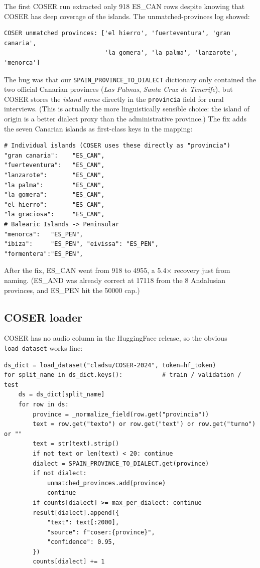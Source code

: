 \documentclass[11pt,a4paper]{article}
\begin{document}
The first COSER run extracted only 918 ES\_CAN rows despite knowing that
COSER has deep coverage of the islands. The unmatched-provinces log
showed:

\begin{lstlisting}[style=shellcode]
COSER unmatched provinces: ['el hierro', 'fuerteventura', 'gran canaria',
                            'la gomera', 'la palma', 'lanzarote', 'menorca']
\end{lstlisting}

The bug was that our \texttt{SPAIN\_PROVINCE\_TO\_DIALECT} dictionary
only contained the two official Canarian provinces
(\emph{Las Palmas}, \emph{Santa Cruz de Tenerife}), but COSER stores the
\emph{island name} directly in the \texttt{provincia} field for rural
interviews. (This is actually the more linguistically sensible choice:
the island of origin is a better dialect proxy than the administrative
province.) The fix adds the seven Canarian islands as first-class keys in
the mapping:

\begin{lstlisting}[style=pycode,caption={Canarian island additions to \texttt{SPAIN\_PROVINCE\_TO\_DIALECT}.}]
# Individual islands (COSER uses these directly as "provincia")
"gran canaria":    "ES_CAN",
"fuerteventura":   "ES_CAN",
"lanzarote":       "ES_CAN",
"la palma":        "ES_CAN",
"la gomera":       "ES_CAN",
"el hierro":       "ES_CAN",
"la graciosa":     "ES_CAN",
# Balearic Islands -> Peninsular
"menorca":   "ES_PEN",
"ibiza":     "ES_PEN", "eivissa": "ES_PEN",
"formentera":"ES_PEN",
\end{lstlisting}

After the fix, ES\_CAN went from 918 to \num{4955}, a 5.4$\times$
recovery just from naming. (ES\_AND was already correct at \num{17118}
from the 8 Andalusian provinces, and ES\_PEN hit the \num{50000} cap.)

\subsection{COSER loader}

COSER has no audio column in the HuggingFace release, so the obvious
\texttt{load\_dataset} works fine:

\begin{lstlisting}[style=pycode,caption={COSER load + iterate all three splits.}]
ds_dict = load_dataset("cladsu/COSER-2024", token=hf_token)
for split_name in ds_dict.keys():           # train / validation / test
    ds = ds_dict[split_name]
    for row in ds:
        province = _normalize_field(row.get("provincia"))
        text = row.get("texto") or row.get("text") or row.get("turno") or ""
        text = str(text).strip()
        if not text or len(text) < 20: continue
        dialect = SPAIN_PROVINCE_TO_DIALECT.get(province)
        if not dialect:
            unmatched_provinces.add(province)
            continue
        if counts[dialect] >= max_per_dialect: continue
        result[dialect].append({
            "text": text[:2000],
            "source": f"coser:{province}",
            "confidence": 0.95,
        })
        counts[dialect] += 1
\end{lstlisting}
\end{document}
